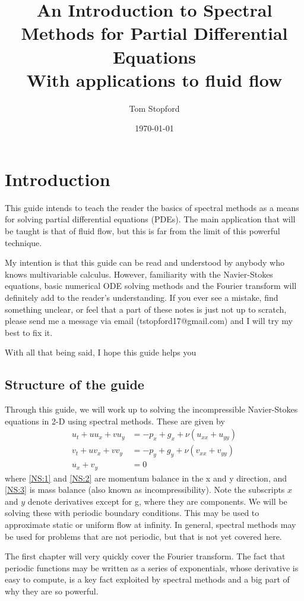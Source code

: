 \documentclass[a4paper,11pt]{article}
\title{An Introduction to Spectral Methods for Partial Differential Equations \\ \large With applications to fluid flow}
\author{Tom Stopford}
\date{\today}
\theoremstyle{plain} %
\theoremstyle{remark}
\theoremstyle{definition} %
\begin{document}
  

\maketitle

\section{Introduction}
This guide intends to teach the reader the basics of spectral methods as a means for solving partial differential equations (PDEs). The main application that will be taught is that of fluid flow, but this is far from the limit of this powerful technique. 

My intention is that this guide can be read and understood by anybody who knows multivariable calculus. However, familiarity with the Navier-Stokes equations, basic numerical ODE solving methods and the Fourier transform will definitely add to the reader's understanding. If you ever see a mistake, find something unclear, or feel that a part of these notes is just not up to scratch, please send me a message via email (tstopford17@gmail.com) and I will try my best to fix it. 

With all that being said, I hope this guide helps you

\subsection{Structure of the guide}
Through this guide, we will work up to solving the incompressible Navier-Stokes equations in 2-D using spectral methods. These are given by
\begin{align}
\label{NS:1}u_t+u u_x+v u_y &= -p_x + g_x + \nu \left(u_{xx}+u_{yy}\right)\\ 
\label{NS:2}v_t+u v_x+v v_y &= -p_y + g_y + \nu \left(v_{xx}+v_{yy}\right) \\ 
\label{NS:3}u_x+v_y&=0 
\end{align}
where \ref{NS:1} and \ref{NS:2} are momentum balance in the x and y direction, and \ref{NS:3} is mass balance (also known as incompressibility). Note the subscripts $x$ and $y$ denote derivatives except for g, where they are components. We will be solving these with periodic boundary conditions. This may be used to approximate static or uniform flow at infinity. In general, spectral methods may be used for problems that are not periodic, but that is not yet covered here.

The first chapter will very quickly cover the Fourier transform. The fact that periodic functions may be written as a series of exponentials, whose derivative is easy to compute, is a key fact exploited by spectral methods and a big part of why they are so powerful.
\end{document}
